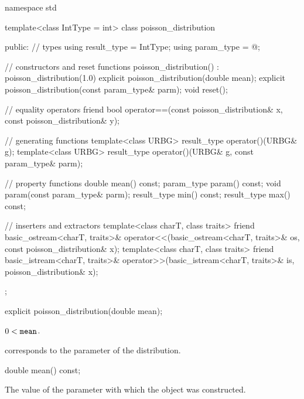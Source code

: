 %
%
\begin{codeblock}
namespace std {
  template<class IntType = int>
  class poisson_distribution {
  public:
    // types
    using result_type = IntType;
    using param_type  = @\unspec@;

    // constructors and reset functions
    poisson_distribution() : poisson_distribution(1.0) {}
    explicit poisson_distribution(double mean);
    explicit poisson_distribution(const param_type& parm);
    void reset();

    // equality operators
    friend bool operator==(const poisson_distribution& x, const poisson_distribution& y);

    // generating functions
    template<class URBG>
      result_type operator()(URBG& g);
    template<class URBG>
      result_type operator()(URBG& g, const param_type& parm);

    // property functions
    double mean() const;
    param_type param() const;
    void param(const param_type& parm);
    result_type min() const;
    result_type max() const;

    // inserters and extractors
    template<class charT, class traits>
      friend basic_ostream<charT, traits>&
        operator<<(basic_ostream<charT, traits>& os, const poisson_distribution& x);
    template<class charT, class traits>
      friend basic_istream<charT, traits>&
        operator>>(basic_istream<charT, traits>& is, poisson_distribution& x);
  };
}
\end{codeblock}

%
\begin{itemdecl}
explicit poisson_distribution(double mean);
\end{itemdecl}

\begin{itemdescr}
\pnum
\expects
$0 < \tcode{mean}$.

\pnum
\remarks
{} corresponds to the parameter of the distribution.
\end{itemdescr}

%
\begin{itemdecl}
double mean() const;
\end{itemdecl}

\begin{itemdescr}
\pnum
\returns
The value of the  parameter
 with which the object was constructed.
\end{itemdescr}

